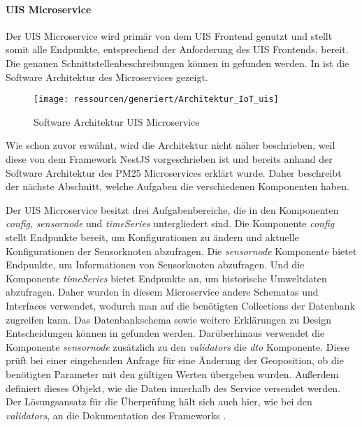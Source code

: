 \paragraph{UIS Microservice} 
Der UIS Microservice wird primär von dem UIS Frontend genutzt und stellt somit alle Endpunkte, entsprechend der Anforderung des UIS Frontends, bereit.
Die genauen Schnittstellenbeschreibungen können in  gefunden werden.
In  ist die Software Architektur des Microservices gezeigt.
\begin{figure}[!htb]
	\centering
	\texttt{[image: ressourcen/generiert/Architektur\_IoT\_uis]}
	\caption{Software Architektur UIS Microservice}
	\label{fig:uisarchi}
\end{figure}
Wie schon zuvor erwähnt, wird die Architektur nicht näher beschrieben, weil diese von dem Framework NestJS vorgeschrieben ist und bereits anhand der Software Architektur des PM25 Microservices erklärt wurde.
Daher beschreibt der nächste Abschnitt, welche Aufgaben die verschiedenen Komponenten haben.


Der UIS Microservice besitzt drei Aufgabenbereiche, die in den Komponenten \textit{config}, \textit{sensornode} und \textit{timeSeries} untergliedert sind.
Die Komponente \textit{config} stellt Endpunkte bereit, um Konfigurationen zu ändern und aktuelle Konfigurationen der Sensorknoten abzufragen.
Die \textit{sensornode} Komponente bietet Endpunkte, um Informationen von Sensorknoten abzufragen.
Und die Komponente \textit{timeSeries} bietet Endpunkte an, um historische Umweltdaten abzufragen.
Daher wurden in diesem Microservice andere Schematas und Interfaces verwendet, wodurch man auf die benötigten Collections der Datenbank zugreifen kann.
Das Datenbankschema sowie weitere Erklärungen zu Design Entscheidungen können in  gefunden werden.
Darüberhinaus verwendet die Komponente \textit{sensornode} zusätzlich zu den \textit{validators} die \textit{dto} Komponente.
Diese prüft bei einer eingehenden Anfrage für eine Änderung der Geoposition, ob die benötigten Parameter mit den gültigen Werten übergeben wurden.
Außerdem definiert dieses Objekt, wie die Daten innerhalb des Service versendet werden.
Der Lösungsansatz für die Überprüfung hält sich auch hier, wie bei den \textit{validators}, an die Dokumentation des Frameworks \cite{validators}.
\FloatBarrier

